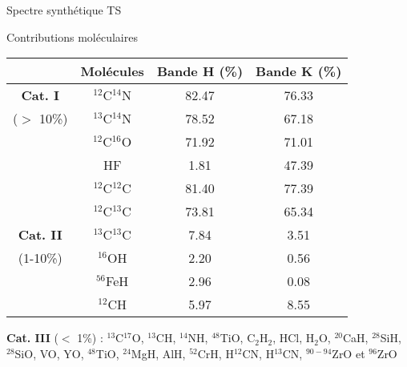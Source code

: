 \documentclass[10pt]{beamer}
\begin{document}
\begin{frame}[fragile]{Spectre synthétique}
    TS
\end{frame}

\begin{frame}[fragile]{Contributions moléculaires}
  
\begin{table}
    \begin{tabular}{c|ccc}
      \toprule
	\midrule
       &Molécules & Bande H (\%) & Bande K (\%)\\
      \midrule
      \cellcolor{green!15}\textbf{Cat. I}&\cellcolor{green!15}$^{12}$C$^{14}$N &\cellcolor{green!15} 82.47 & \cellcolor{green!15}76.33  \\
      \small\cellcolor{green!15}($>$ 10\%)&\cellcolor{green!15}$^{13}$C$^{14}$N & \cellcolor{green!15}78.52 & \cellcolor{green!15}67.18  \\
      \cellcolor{green!15}&\cellcolor{green!15}$^{12}$C$^{16}$O &\cellcolor{green!15}71.92 &\cellcolor{green!15}71.01   \\
      \cellcolor{green!15}&\cellcolor{green!15}HF & \cellcolor{green!15}1.81 &\cellcolor{green!15}47.39   \\
	  \cellcolor{green!15}&\cellcolor{green!15}$^{12}$C$^{12}$C &\cellcolor{green!15} 81.40 & \cellcolor{green!15}77.39  \\
	\cellcolor{green!15}&\cellcolor{green!15}$^{12}$C$^{13}$C & \cellcolor{green!15}73.81  & \cellcolor{green!15}65.34   \\
	\cellcolor{yellow!15}\textbf{Cat. II}&\cellcolor{yellow!15}$^{13}$C$^{13}$C &\cellcolor{yellow!15} 7.84  & \cellcolor{yellow!15}3.51  \\
	\small\cellcolor{yellow!15}(1-10\%)&\cellcolor{yellow!15}$^{16}$OH &\cellcolor{yellow!15}2.20  &\cellcolor{yellow!15}0.56    \\
	\cellcolor{yellow!15}&\cellcolor{yellow!15}$^{56}$FeH &\cellcolor{yellow!15} 2.96  &\cellcolor{yellow!15}0.08   \\
	\cellcolor{yellow!15}&\cellcolor{yellow!15}$^{12}$CH & \cellcolor{yellow!15}5.97  & \cellcolor{yellow!15}8.55   \\
      \bottomrule
    \end{tabular}
  \end{table}
\textbf{Cat. III} ($<$ 1\%) : $^{13}$C$^{17}$O, $^{13}$CH, $^{14}$NH, $^{48}$TiO, C$_{2}$H$_2$, HCl, H$_{2}$O, $^{20}$CaH, $^{28}$SiH, $^{28}$SiO, VO, YO, $^{48}$TiO, $^{24}$MgH, AlH, $^{52}$CrH, H$^{12}$CN, H$^{13}$CN, $^{90-94}$ZrO et $^{96}$ZrO
\end{frame}
\end{document}
